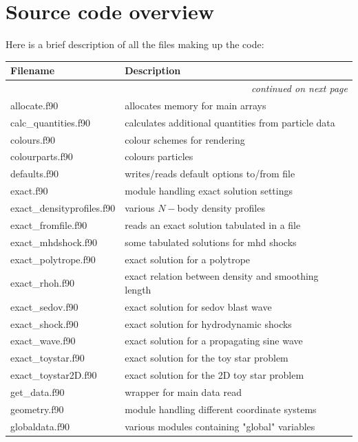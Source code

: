 \documentclass[a4paper,10pt]{article}
\begin{document}
\section{Source code overview}%
Here is a brief description of all the files making up the code:
\begin{longtable}{|lp{}|}
\hline
Filename & Description \\
\hline \endhead
\multicolumn{2}{|r|}{\emph{continued on next page}} \\
\hline \endfoot
\hline \endlastfoot
     allocate.f90           & allocates memory for main arrays \\
     calc\_quantities.f90    & calculates additional quantities from particle data \\
     colours.f90            & colour schemes for rendering\\
     colourparts.f90	 & colours particles\\
     defaults.f90           & writes/reads default options to/from file\\
     exact.f90              & module handling exact solution settings\\
     exact\_densityprofiles.f90 & various $N-$body density profiles \\
     exact\_fromfile.f90     & reads an exact solution tabulated in a file\\
     exact\_mhdshock.f90     & some tabulated solutions for mhd shocks\\ 
     exact\_polytrope.f90    & exact solution for a polytrope\\
     exact\_rhoh.f90	 & exact relation between density and smoothing length\\
     exact\_sedov.f90        & exact solution for sedov blast wave\\
     exact\_shock.f90        & exact solution for hydrodynamic shocks\\
     exact\_wave.f90         & exact solution for a propagating sine wave\\
     exact\_toystar.f90      & exact solution for the toy star problem\\
     exact\_toystar2D.f90    & exact solution for the 2D toy star problem\\
     get\_data.f90           & wrapper for main data read\\
     geometry.f90           & module handling different coordinate systems\\
     globaldata.f90         & various modules containing "global" variables\\

\end{longtable}
\end{document}
